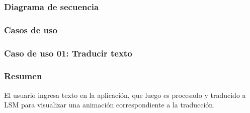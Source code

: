 \subsubsection{Diagrama de secuencia}
\begin{center}
\end{center}

\subsubsection{Casos de uso}
\subsubsection{Caso de uso 01: Traducir texto}
\subsubsection{Resumen}
El usuario ingresa texto en la aplicación, que luego es procesado y traducido a LSM para visualizar una animación correspondiente a la traducción.
